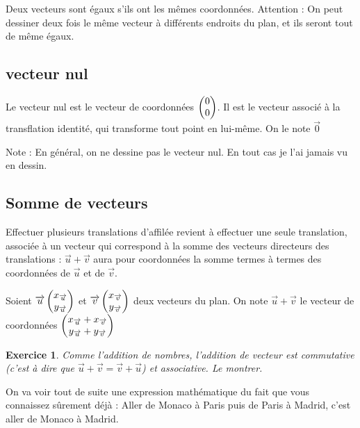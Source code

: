 \documentclass[10pt,a4paper,oneside]{book}
\newtheorem{exo}{Exercice}
\begin{document}
\begin{de}
    Deux vecteurs sont égaux s'ils ont les mêmes coordonnées. Attention : On peut dessiner deux fois le même vecteur à différents endroits du plan, et ils seront tout de même égaux.
\end{de}

\subsection{vecteur nul}

\begin{de}
    Le vecteur nul est le vecteur de coordonnées $ \begin{pmatrix} 0\\ 0 \end{pmatrix}$. Il est le vecteur associé à la transflation identité, qui transforme tout point en lui-même. On le note $\overrightarrow{0}$
\end{de}

Note : En général, on ne dessine pas le vecteur nul. En tout cas je l'ai jamais vu en dessin.

\subsection{Somme de vecteurs}

Effectuer plusieurs translations d'affilée revient à effectuer une seule translation, associée à un vecteur qui correspond à la somme des vecteurs directeurs des translations : $\overrightarrow{u}+\overrightarrow{v}$ aura pour coordonnées la somme termes à termes des coordonnées de $\overrightarrow{u}$ et de $\overrightarrow{v}$.

\begin{de}
    Soient $\overrightarrow{u}  \begin{pmatrix} x_{\overrightarrow{u}}\\ y_{\overrightarrow{u}} \end{pmatrix}$ et 
    $\overrightarrow{v}  \begin{pmatrix} x_{\overrightarrow{v}}\\ y_{\overrightarrow{v}} \end{pmatrix}$ deux vecteurs du plan. 
    On note $\overrightarrow{u}+\overrightarrow{v}$ le vecteur de coordonnées 
    $ \begin{pmatrix} x_{\overrightarrow{u}}+x_{\overrightarrow{v}}\\ y_{\overrightarrow{u}}+y_{\overrightarrow{v}} \end{pmatrix}$
\end{de}

\begin{exo}
  Comme l'addition de nombres, l'addition de vecteur est commutative (c'est à dire que $\overrightarrow{u}+\overrightarrow{v} = \overrightarrow{v}+\overrightarrow{u}$) et associative. Le montrer.
\end{exo}

On va voir tout de suite une expression mathématique du fait que vous connaissez sûrement déjà : Aller de Monaco à Paris puis de Paris à Madrid, c'est aller de Monaco à Madrid.
\end{document}
